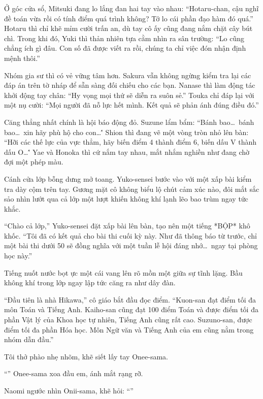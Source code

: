 \documentclass[../main.tex]{subfiles}
\begin{document}
Ở góc cửa sổ, Mitsuki đang lo lắng đan hai tay vào nhau: ``Hotaru-chan, cậu nghĩ đề toán vừa rồi có tính điểm quá trình không? Tớ lo cái phần đạo hàm đó quá.'' Hotaru thì chỉ khẽ mỉm cười trấn an, dù tay cô ấy cũng đang nắm chặt cây bút chì. Trong khi đó, Yuki thì thản nhiên tựa cằm nhìn ra sân trường: ``Lo cũng chẳng ích gì đâu. Con số đã được viết ra rồi, chúng ta chỉ việc đón nhận định mệnh thôi.''

Nhóm gia sư thì có vẻ vững tâm hơn. Sakura vẫn không ngừng kiểm tra lại các đáp án trên tờ nháp để sẵn sàng đối chiếu cho các bạn. Nanase thì làm động tác khởi động tay chân: ``Hy vọng mọi thứ sẽ diễn ra suôn sẻ.'' Touka chỉ đáp lại với một nụ cười: ``Mọi người đã nỗ lực hết mình. Kết quả sẽ phản ánh đúng điều đó.''

Căng thẳng nhất chính là hội báo động đỏ. Suzune lẩm bẩm: ``Bánh bao\dots\ bánh bao\dots\ xin hãy phù hộ cho con\dots\'' Shion thì đang vẽ một vòng tròn nhỏ lên bàn: ``Hỡi các thế lực của vực thẳm, hãy biến điểm 4 thành điểm 6, biến dấu V thành dấu O\dots\'' Yae và Honoka thì cứ nắm tay nhau, mắt nhắm nghiền như đang chờ đợi một phép màu.

Cánh cửa lớp bỗng dưng mở toang. Yuko-sensei bước vào với một xấp bài kiểm tra dày cộm trên tay. Gương mặt cô không biểu lộ chút cảm xúc nào, đôi mắt sắc sảo nhìn lướt qua cả lớp một lượt khiến không khí lạnh lẽo bao trùm ngay tức khắc.

``Chào cả lớp,'' Yuko-sensei đặt xấp bài lên bàn, tạo nên một tiếng *BỘP* khô khốc. ``Tôi đã có kết quả cho bài thi cuối kỳ này. Như đã thông báo từ trước, chỉ một bài thi dưới 50 sẽ đồng nghĩa với một tuần lễ hội đáng nhớ\dots\ ngay tại phòng học này.''

Tiếng nuốt nước bọt ực một cái vang lên rõ mồn một giữa sự tĩnh lặng. Bầu không khí trong lớp ngay lập tức căng ra như dây đàn.

``Đầu tiên là nhà Hikawa,'' cô giáo bắt đầu đọc điểm. ``Kuon-san đạt điểm tối đa môn Toán và Tiếng Anh. Kaiho-san cũng đạt 100 điểm Toán và được điểm tối đa phần Vật lý của Khoa học tự nhiên, Tiếng Anh cũng rất cao. Suzuno-san, được điểm tối đa phần Hóa học. Môn Ngữ văn và Tiếng Anh của em cũng nằm trong nhóm dẫn đầu.''

Tôi thở phào nhẹ nhõm, khẽ siết lấy tay Onee-sama.

``'' Onee-sama xoa đầu em, ánh mắt rạng rỡ.

Naomi ngước nhìn Onii-sama, khẽ hỏi: ``''
\end{document}
